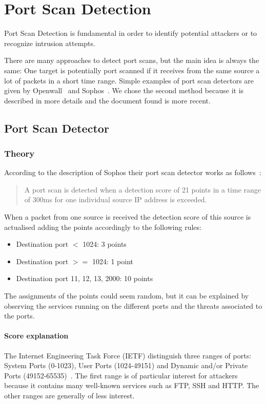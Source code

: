 \chapter{Port Scan Detection}
\label{sec:detector}
Port Scan Detection is fundamental in order
to identify potential attackers or to recognize intrusion attempts.

There are many approaches to detect port scans, but the main idea
is always the same: One target is potentially port scanned if it receives
from the same source a lot of packets in a short time range.
Simple examples of port scan detectors are given by 
Openwall~\cite{scanlogd} and Sophos~\cite{sophos}.
We chose the second method because it is described in more details and the document found
is more recent.






\section{Port Scan Detector}


\subsection{Theory}
According to the description of Sophos their port scan detector works as follows~\cite{sophos}:
\begin{quote}
	A port scan is detected when a detection score of 21 points
	in a time range of 300ms for one individual source IP address is exceeded.
\end{quote}
When a packet from one source is received the detection score of this source
is actualised adding the points accordingly to the following rules:
\begin{itemize}
	\item Destination port $<$ 1024: 3 points
	\item Destination port $>=$ 1024: 1 point
	\item Destination port 11, 12, 13, 2000: 10 points
\end{itemize}
The assignments of the points could seem random, but it can be explained by observing the services running on the different ports and the threats associated to the ports.
\subsubsection{Score explanation}
The Internet Engineering Task Force (IETF) distinguish three ranges of ports: System Ports (0-1023), 
User Ports (1024-49151) and Dynamic and/or Private Ports (49152-65535)~\cite{rfc6335}.
The first range is of particular interest for attackers because it contains many well-known services such as FTP, SSH and HTTP.
The other ranges are generally of less interest.

